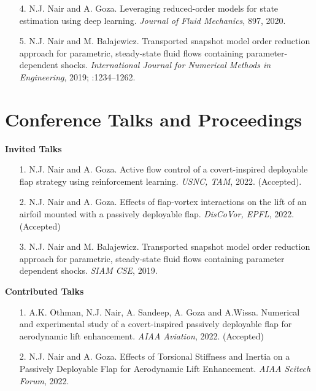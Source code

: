 \documentclass[margin]{res}
\begin{document}
\begin{resume}
\begin{itemize}
	\item[4.] N.J. Nair and A. Goza. Leveraging reduced-order models for state estimation using deep learning. \textit{Journal of Fluid Mechanics}, 897, 2020.
	
	\item[5.] N.J. Nair and M. Balajewicz. Transported snapshot model order reduction approach for parametric, steady-state fluid flows containing parameter-dependent shocks. \textit{International Journal for Numerical Methods in Engineering}, 2019; :1234–1262.
	
 \end{itemize}
 
\section{\large Conference Talks and Proceedings}

\textbf{Invited Talks}

\begin{itemize} 
	
 \item[1.] N.J. Nair and A. Goza. Active flow control of a covert-inspired deployable flap strategy using reinforcement learning. \textit{USNC, TAM}, 2022. (Accepted).
 
 \item[2.] N.J. Nair and A. Goza. Effects of flap-vortex interactions on the lift of an airfoil mounted with a passively deployable flap. \textit{DisCoVor, EPFL}, 2022. (Accepted)
 
 \item[3.] N.J. Nair and M. Balajewicz. Transported snapshot model order reduction approach for parametric, steady-state fluid flows containing parameter dependent shocks. \textit{SIAM CSE}, 2019.
 
\end{itemize}

\textbf{Contributed Talks} 
\begin{itemize}

 \item[1.] A.K. Othman, N.J. Nair, A. Sandeep, A. Goza and A.Wissa. Numerical and experimental study of a covert-inspired
passively deployable flap for aerodynamic lift enhancement. \textit{AIAA Aviation}, 2022. (Accepted)

 \item[2.] N.J. Nair and A. Goza. Effects of Torsional Stiffness and Inertia on a Passively Deployable Flap for Aerodynamic Lift Enhancement. \textit{AIAA Scitech Forum}, 2022.
 

\end{itemize}
\end{resume}
\end{document}
